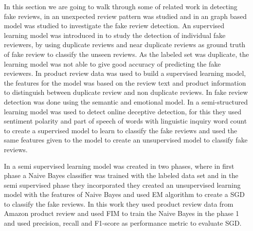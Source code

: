 \documentclass[sigconf]{acmart}
\begin{document}
In this section we are going to walk through some of related work in detecting fake reviews, in \cite{7873647} an unexpected review pattern was studied and in \cite{6137345} an graph based model was studied to investigate the fake review detection. An supervised learning model was introduced in \cite{8026958} to study the detection of individual fake reviewers, by using duplicate reviews and near duplicate reviews as ground truth of fake review to classify the unseen reviews. As the labeled set was duplicate, the learning model was not able to give good accuracy of predicting the fake reviewers. In \cite{7873647} product review data was used to build a supervised learning model, the features for the model was based on the review text and product information to distinguish between duplicate review and non duplicate reviews. In \cite{7726174} fake review detection was done using the semantic and emotional model. In \cite{7822945} a semi-structured learning model was used to detect online deceptive detection, for this they used sentiment polarity and part of speech of words with linguistic inquiry word count  to create a supervised model to learn to classify the fake reviews and used the same features given to the model to create an unsupervised model to classify fake reviews.

In \cite{8026965} a semi supervised learning model was created in two phases, where in first phase a Naive Bayes classifier was trained with the labeled data set and in the semi supervised phase they incorporated they created an unsupervised learning model with the features of Naive Bayes and used EM algorithm to create a SGD to classify the fake reviews.  In this work they used product review data from Amazon product review and used FIM \cite{8026965} to train the Naive Bayes in the phase 1 and used precision, recall and F1-score as performance metric to evaluate SGD.
\end{document}
